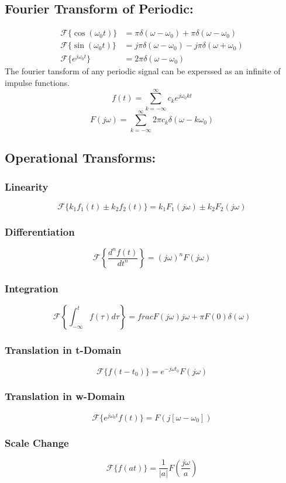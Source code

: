 \documentclass[a5paper]{article}
\newcommand{\For}{\mathcal{F}}
\begin{document}
	\subsection{Fourier Transform of Periodic:}
	\begin{align*}
		\For\{\cos{(\omega_{0}t)}\}&=\pi\delta(\omega-\omega_{0})+\pi\delta(\omega-\omega_{0})\\
		\For\{\sin{(\omega_{0}t)}\}&=j\pi\delta(\omega-\omega_{0})-j\pi\delta(\omega+\omega_{0})\\
		\For\{e^{j\omega_{0}t}\}&=2\pi\delta(\omega-\omega_{0})
	\end{align*}
	The fourier tansform of any periodic signal can be experssed as an infinite of impulse functions.
	$$f(t)=\sum^{\infty}_{k=-\infty}c_{k}e^{j\omega_{0}kt}$$
	$$F(j\omega)=\sum^{\infty}_{k=-\infty}2\pi c_{k}\delta(\omega-k\omega_{0})$$
	\subsection{Operational Transforms:}
	\subsubsection{Linearity}
	$$\For\{k_{1}f_{1}(t)\pm k_{2}f_{2}(t)\}=k_{1}F_{1}(j\omega)\pm k_{2}F_{2}(j\omega)$$
	\subsubsection{Differentiation}
	$$\For\left\{\frac{d^{n}f(t)}{dt^{n}}\right\}=(j\omega)^{n}F(j\omega)$$
	\subsubsection{Integration}
	$$\For\left\{\int^{t}_{-\infty}f(\tau)d\tau\right\}=frac{F(j\omega)}{j\omega}+\pi F(0)\delta(\omega)$$
	\subsubsection{Translation in t-Domain}
	$$\For\{f(t-t_{0})\}=e^{-j\omega t_{0}}F(j\omega)$$
	\subsubsection{Translation in w-Domain}
	$$\For\{e^{j\omega_{0}t}f(t)\}=F(j[\omega-\omega_{0}])$$
	\subsubsection{Scale Change}
	$$\For\{f(at)\}=\frac{1}{|a|}F(\frac{j\omega}{a})$$
\end{document}
